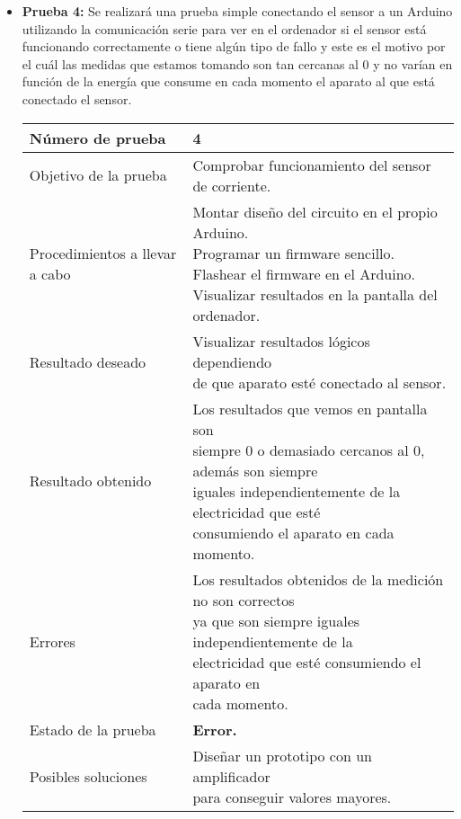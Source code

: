 \begin{itemize}
	\vspace{8.5cm}
	
	\item \textbf{Prueba 4:} Se realizará una prueba simple conectando el sensor a un Arduino utilizando la comunicación serie para ver en el ordenador si el sensor está funcionando correctamente o tiene algún tipo de fallo y este es el motivo por el cuál las medidas que estamos tomando son tan cercanas al 0 y no varían en función de la energía que consume en cada momento el aparato al que está conectado el sensor.
	
		\begin{table}[H]
		\begin{center}
			\begin{tabular}{|l|l|}
				\hline
				Número de prueba &  4 \\ \hline 
				Objetivo de la prueba &  Comprobar funcionamiento del sensor de corriente. \\ \hline 
				Procedimientos a llevar a cabo &  \makecell[l]{\tabitem Montar diseño del circuito en el propio Arduino. \\ \tabitem Programar un firmware sencillo.
					\\ \tabitem Flashear el firmware en el Arduino.
					\\ \tabitem Visualizar resultados en la pantalla del ordenador.}
				\\ \hline 
				Resultado deseado &  \makecell[l]{Visualizar resultados lógicos dependiendo \\ de que aparato esté conectado al sensor.} \\ \hline 
				Resultado obtenido &  \makecell[l]{Los resultados que vemos en pantalla son \\ siempre 0 o demasiado cercanos al 0, además son siempre \\ iguales independientemente de la electricidad que esté \\ consumiendo el aparato en cada momento.} \\ \hline 
				Errores &  \makecell[l]{Los resultados obtenidos de la medición no son correctos \\ ya que son siempre iguales independientemente de la \\electricidad que esté consumiendo el aparato en\\ cada momento.} \\ \hline 
				Estado de la prueba &  \textbf{Error.} \\ \hline 
				Posibles soluciones &  \makecell[l]{Diseñar un prototipo con un amplificador \\ para conseguir valores mayores. } \\ \hline 
				

\end{tabular}
\end{center}
\end{table}
\end{itemize}
